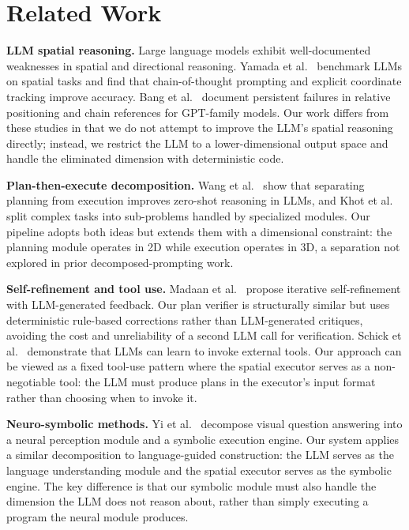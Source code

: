 \documentclass{article}
\begin{document}
\section{Related Work}

\textbf{LLM spatial reasoning.}
Large language models exhibit well-documented weaknesses in spatial and
directional reasoning. Yamada et al.~\cite{yamada2024} benchmark LLMs on
spatial tasks and find that chain-of-thought prompting and explicit coordinate
tracking improve accuracy. Bang et al.~\cite{bang2023} document persistent
failures in relative positioning and chain references for GPT-family models.
Our work differs from these studies in that we do not attempt to improve the
LLM's spatial reasoning directly; instead, we restrict the LLM to a
lower-dimensional output space and handle the eliminated dimension with
deterministic code.

\textbf{Plan-then-execute decomposition.}
Wang et al.~\cite{wang2023} show that separating planning from execution
improves zero-shot reasoning in LLMs, and Khot et al.~\cite{khot2023} split
complex tasks into sub-problems handled by specialized modules. Our pipeline
adopts both ideas but extends them with a dimensional constraint: the
planning module operates in 2D while execution operates in 3D, a separation
not explored in prior decomposed-prompting work.

\textbf{Self-refinement and tool use.}
Madaan et al.~\cite{madaan2023} propose iterative self-refinement with
LLM-generated feedback. Our plan verifier is structurally similar but uses
deterministic rule-based corrections rather than LLM-generated critiques,
avoiding the cost and unreliability of a second LLM call for verification.
Schick et al.~\cite{schick2023} demonstrate that LLMs can learn to invoke
external tools. Our approach can be viewed as a fixed tool-use pattern where
the spatial executor serves as a non-negotiable tool: the LLM must produce
plans in the executor's input format rather than choosing when to invoke it.

\textbf{Neuro-symbolic methods.}
Yi et al.~\cite{yi2018} decompose visual question answering into a neural
perception module and a symbolic execution engine. Our system applies a
similar decomposition to language-guided construction: the LLM serves as the
language understanding module and the spatial executor serves as the symbolic
engine. The key difference is that our symbolic module must also handle the
dimension the LLM does not reason about, rather than simply executing a
program the neural module produces.
\end{document}
